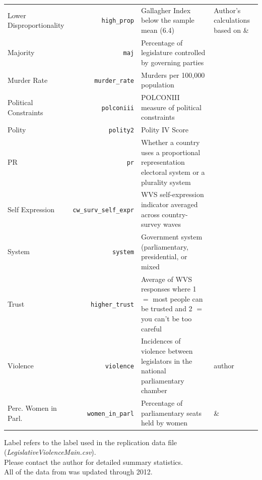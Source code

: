 \documentclass[a4paper]{article}\usepackage[]{graphicx}\usepackage[]{color}
\begin{document}
\begin{table}[H]
\begin{center}
\begin{tabular}{m{2cm} r m{7cm} m{3.5cm}}
            Lower Disproportionality & \verb|high_prop| & Gallagher Index below the sample mean (6.4) & Author's calculations based on \cite{Gallagher2012} \& \cite{Carey2011}\\
            Majority & \texttt{maj} & Percentage of legislature controlled by governing parties & \cite{DPI2001} \\
            Murder Rate & \verb|murder_rate| & Murders per 100,000 population & \cite{UNMurder2013} \\
            Political Constraints & \texttt{polconiii} & POLCONIII measure of political constraints & \cite[][updated through 2011]{Henisz2004} \\
            Polity & \texttt{polity2} & Polity IV Score & \cite{Marshall2009} \\
            PR & \texttt{pr} & Whether a country uses a proportional representation electoral system or a plurality system & \cite{DPI2001} \\
            Self Expression & \verb|cw_surv_self_expr| & WVS self-expression indicator averaged across country-survey waves & \cite{WVS2009} \\
            System & \texttt{system} & Government system (parliamentary, presidential, or mixed & \cite{DPI2001} \\
            Trust & \verb|higher_trust| & Average of WVS responses where 1 $=$ most people can be trusted and 2 $=$ you can't be too careful & \cite{WVS2009} \\
            Violence & \texttt{violence} & Incidences of violence between legislators in the national parliamentary chamber & author \\
            Perc. Women in Parl. & \verb|women_in_parl| & Percentage of parliamentary seats held by women & \cite{WomParCrossNat} \& \cite{IPU2013} \\
            \hline

    \end{tabular}
    \end{center}
    \begin{singlespace}
        Label refers to the label used in the replication data file (\emph{LegislativeViolenceMain.csv}). \\
        Please contact the author for detailed summary statistics. \\
        All of the data from \cite{DPI2001} was updated through 2012.
    \end{singlespace}

\end{table}
\end{document}
